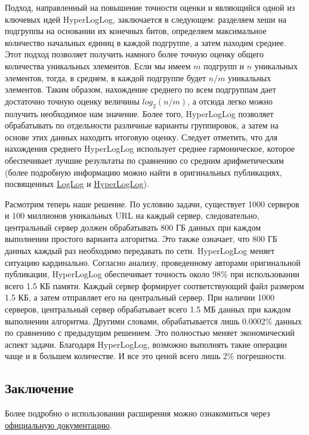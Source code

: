 Подход, направленный на повышение точности оценки и являющийся одной из ключевых идей HyperLogLog, заключается в следующем: разделяем хеши на подгруппы на основании их конечных битов, определяем максимальное количество начальных единиц в каждой подгруппе, а затем находим среднее. Этот подход позволяет получить намного более точную оценку общего количества уникальных элементов. Если мы имеем $m$ подгрупп и $n$ уникальных элементов, тогда, в среднем, в каждой подгруппе будет $n/m$ уникальных элементов. Таким образом, нахождение среднего по всем подгруппам дает достаточно точную оценку величины $log_2{(n/m)}$, а отсюда легко можно получить необходимое нам значение. Более того, HyperLogLog позволяет обрабатывать по отдельности различные варианты группировок, а затем на основе этих данных находить итоговую оценку. Следует отметить, что для нахождения среднего HyperLogLog использует среднее гармоническое, которое обеспечивает лучшие результаты по сравнению со средним арифметическим (более подробную информацию можно найти в оригинальных публикациях, посвященных \href{http://www.ic.unicamp.br/~celio/peer2peer/math/bitmap-algorithms/durand03loglog.pdf}{LogLog} и \href{http://algo.inria.fr/flajolet/Publications/FlFuGaMe07.pdf}{HyperLogLog}).

Расмотрим теперь наше решение. По условию задачи, существует 1000 серверов и 100 миллионов уникальных URL на каждый сервер, следовательно, центральный сервер должен обрабатывать 800 ГБ данных при каждом выполнении простого варианта алгоритма. Это также означает, что 800 ГБ данных каждый раз необходимо передавать по сети. HyperLogLog меняет ситуацию кардинально. Согласно анализу, проведенному авторами оригинальной публикации, HyperLogLog обеспечивает точность около 98\% при использовании всего 1.5 КБ памяти. Каждый сервер формирует соответствующий файл размером 1.5 КБ, а затем отправляет его на центральный сервер. При наличии 1000 серверов, центральный сервер обрабатывает всего 1.5 МБ данных при каждом выполнении алгоритма. Другими словами, обрабатывается лишь 0.0002\% данных по сравнению с предыдущим решением. Это полностью меняет экономический аспект задачи. Благодаря HyperLogLog, возможно выполнять такие операции чаще и в большем количестве. И все это ценой всего лишь 2\% погрешности.



\subsection{Заключение}

Более подробно о использовании расширения можно ознакомиться через \href{https://github.com/aggregateknowledge/postgresql-hll/blob/master/README.markdown}{официальную документацию}.
